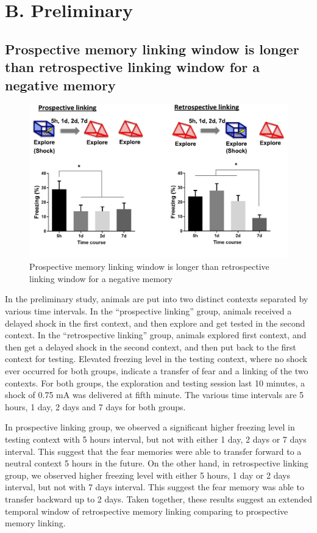 \documentclass[master.tex]{subfiles}
\begin{document}
\section*{B. Preliminary}

\subsection{Prospective memory linking window is longer than retrospective
  linking window for a negative memory}

\begin{figure}
  \centering \includegraphics[scale = .4]{Figures/pro_retro_prelim.pdf}
  \caption{\footnotesize Prospective memory linking window is longer than
    retrospective linking window for a negative memory}
  \label{fig:prelim_pro_retro}
\end{figure}

In the preliminary study, animals are put into two distinct contexts separated
by various time intervals. In the ``prospective linking'' group, animals
received a delayed shock in the first context, and then explore and get tested
in the second context. In the ``retrospective linking'' group, animals explored
first context, and then get a delayed shock in the second context, and then put
back to the first context for testing. Elevated freezing level in the testing
context, where no shock ever occurred for both groups, indicate a transfer of
fear and a linking of the two contexts. For both groups, the exploration and
testing session last 10 minutes, a shock of 0.75 mA was delivered at fifth
minute. The various time intervals are 5 hours, 1 day, 2 days and 7 days for
both groups.

In prospective linking group, we observed a significant higher freezing level in
testing context with 5 hours interval, but not with either 1 day, 2 days or 7
days interval. This suggest that the fear memories were able to transfer forward
to a neutral context 5 hours in the future. On the other hand, in retrospective
linking group, we observed higher freezing level with either 5 hours, 1 day or 2
days interval, but not with 7 days interval. This suggest the fear memory was
able to transfer backward up to 2 days. Taken together, these results suggest an
extended temporal window of retrospective memory linking comparing to
prospective memory linking.
\end{document}
